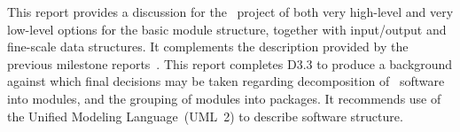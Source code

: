 This report provides a discussion for the \nep\ project
of both very high-level and very low-level options for the basic module structure,
together with input/output and fine-scale data structures.
It complements the description provided by the previous milestone
reports~\cite{y1re331,y2re332,y2re333}.
This report completes D3.3 to produce a background against which final decisions may be taken
regarding decomposition of \nep\ software into modules,
and the grouping of modules into packages. It recommends use of the
Unified Modeling Language~(UML~2) to describe software structure.

